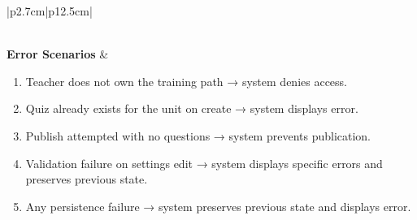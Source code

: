 \begin{table}[H]
\begin{tabular}{|p{2.7cm}|p{12.5cm}|}
\begin{minipage}[t]{\linewidth}
\begin{enumerate}[topsep=0pt,itemsep=1pt,parsep=0pt,partopsep=0pt]
            \end{enumerate}
        \end{minipage} \\
        \hline
        \textbf{Error Scenarios} &
        \begin{minipage}[t]{\linewidth}
            \begin{enumerate}[topsep=0pt,itemsep=1pt,parsep=0pt,partopsep=0pt]
                \item Teacher does not own the training path → system denies access.
                \item Quiz already exists for the unit on create → system displays error.
                \item Publish attempted with no questions → system prevents publication.
                \item Validation failure on settings edit → system displays specific errors and preserves previous state.
                \item Any persistence failure → system preserves previous state and displays error.
            \end{enumerate}
        \end{minipage} \\
        \hline
    \end{tabular}
    \label{tab:teacher-manage-quiz}
\end{table}
 
